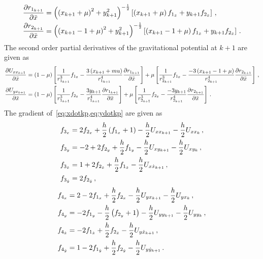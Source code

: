 \documentclass[letterpaper, paper,11pt]{AAS}		%
\begin{document}
\begin{subequations}\label{eq:distkp_grad}
\begin{align}
	\frac{\partial r_{1_{k+1}}}{\partial \bar{x}} &= \left( \left( x_{k+1} + \mu\right)^2 + y_{k+1}^2 \right)^{-\frac{1}{2}} \left[ \left( x_{k+1} + \mu \right) f_{1_{\bar{x}}} + y_{k+1} f_{2_{\bar{x}}} \right] \, ,\\
	\frac{\partial r_{2_{k+1}}}{\partial \bar{x}} &= \left( \left( x_{k+1} - 1 + \mu\right)^2 + y_{k+1}^2 \right)^{-\frac{1}{2}} \left[ \left( x_{k+1} -1 + \mu \right) f_{1_{\bar{x}}} + y_{k+1} f_{2_{\bar{x}}} \right]  \, .
\end{align}
\end{subequations}
The second order partial derivatives of the gravitational potential at \( k+1\) are given as
\begin{subequations}
\begin{align}
	\frac{\partial U_{xx_{k+1}}}{\partial \bar{x}} &= \left( 1-\mu \right)\left[ \frac{1}{r_{1_{k+1}}^3} f_{1_{\bar{x}}} - \frac{3 \left( x_{k+1} +mu \right)}{r_{1_{k+1}}^4} \frac{\partial r_{1_{k+1}}}{\partial \bar{x}} \right] + \mu \left[ \frac{1}{r_{2_{k+1}}^3} f_{1_{\bar{x}}} - \frac{-3 \left( x_{k+1} -1 + \mu \right)}{r_{2_{k+1}}^4} \frac{\partial r_{2_{k+1}}}{\partial \bar{x}} \right] \, ,\\
	\frac{\partial U_{yx_{k+1}}}{\partial \bar{x}} &= \left( 1-\mu \right)\left[ \frac{1}{r_{1_{k+1}}^3} f_{2_{\bar{x}}} - \frac{3 y_{k+1}}{r_{1_{k+1}}^4} \frac{\partial r_{1_{k+1}}}{\partial \bar{x}} \right] + \mu \left[ \frac{1}{r_{2_{k+1}}^3} f_{2_{\bar{x}}} - \frac{-3 y_{k+1}}{r_{2_{k+1}}^4} \frac{\partial r_{2_{k+1}}}{\partial \bar{x}} \right] \, .
\end{align}
\end{subequations}
The gradient of~\cref{eq:xdotkp,eq:ydotkp} are given as
\begin{subequations}\label{eq:xdotkp_grad}
\begin{align}
	f_{3_x} &= 2 f_{2_x} + \frac{h}{2} \left( f_{1_x} + 1 \right) - \frac{h}{2} U_{xx_{k+1}} - \frac{h}{2} U_{xx_k} \, ,\\
	f_{3_y} &= -2 + 2 f_{2_y} + \frac{h}{2} f_{1_y} - \frac{h}{2} U_{xy_{k+1}} -\frac{h}{2} U_{xy_{k}} \, ,\\
	f_{3_{\dot{x}}} &= 1 + 2 f_{2_{\dot{x}}} + \frac{h}{2} f_{1_{\dot{x}}} - \frac{h}{2} U_{x\dot{x}_{k+1}}\, ,\\
	f_{3_{\dot{y}}} &= 2 f_{2_{\dot{y}}}\, ,
\end{align}
\end{subequations}
\begin{subequations}\label{eq:ydotkp_grad}
\begin{align}
	f_{4_x} &= 2 - 2 f_{1_x} + \frac{h}{2} f_{2_x}  - \frac{h}{2} U_{yx_{k+1}} - \frac{h}{2} U_{yx_k} \, ,\\
	f_{4_y} &= -2f_{1_y}  - \frac{h}{2} \left( f_{2_y} + 1 \right) - \frac{h}{2} U_{yy_{k+1}} -\frac{h}{2} U_{yy_{k}} \, ,\\
	f_{4_{\dot{x}}} &= - 2 f_{1_{\dot{x}}} +  \frac{h}{2} f_{2_{\dot{x}}} - \frac{h}{2} U_{y\dot{x}_{k+1}}\, ,\\
	f_{4_{\dot{y}}} &= 1 - 2 f_{1_{\dot{y}}} + \frac{h}{2} f_{2_{\dot{y}}} - \frac{h}{2} U_{y\dot{y}_{k+1}}\, .
\end{align}
\end{subequations}
\end{document}
